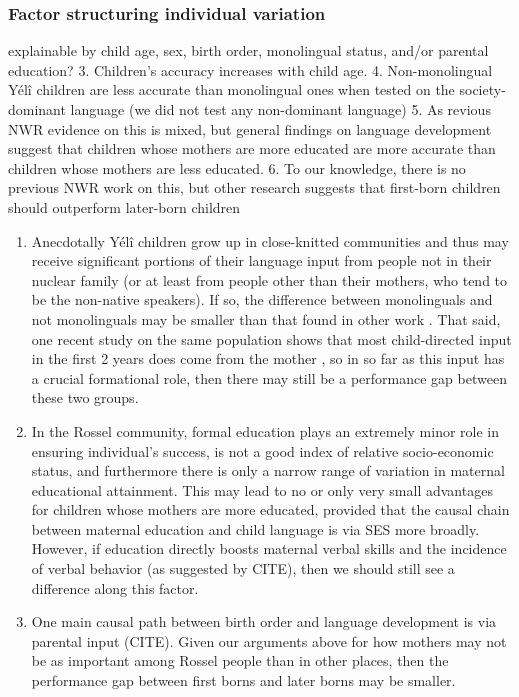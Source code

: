 \documentclass[english,,man,floatsintext]{apa6}
\providecommand{\tightlist}{%
  \setlength{\itemsep}{0pt}\setlength{\parskip}{0pt}}
\begin{document}
\hypertarget{factor-structuring-individual-variation}{%
\subsubsection{Factor structuring individual variation}\label{factor-structuring-individual-variation}}

explainable by child age, sex, birth order, monolingual status, and/or parental education?
3. Children's accuracy increases with child age.
4. Non-monolingual Yélî children are less accurate than monolingual ones when tested on the society-dominant language (we did not test any non-dominant language)
5. As revious NWR evidence on this is mixed, but general findings on language development suggest that children whose mothers are more educated are more accurate than children whose mothers are less educated.
6. To our knowledge, there is no previous NWR work on this, but other research suggests that first-born children should outperform later-born children

\begin{enumerate}
\def\labelenumi{\arabic{enumi}.}
\setcounter{enumi}{3}
\tightlist
\item
  Anecdotally Yélî children grow up in close-knitted communities and thus may receive significant portions of their language input from people not in their nuclear family
  (or at least from people other than their mothers, who tend to be the non-native speakers). If so, the difference between monolinguals and not monolinguals may be smaller than that found in other work
  . That said, one recent study on the same population shows that most child-directed input in the first 2 years does come from the mother
  , so in so far as this input has a crucial formational role, then there may still be a performance gap between these two groups.
\item
  In the Rossel community, formal education plays an extremely minor role in ensuring individual's success, is not a good index of relative socio-economic status, and furthermore there is only a narrow range of variation in maternal educational attainment. This may lead to no or only very small advantages for children whose mothers are more educated, provided that the causal chain between maternal education and child language is via SES more broadly. However, if education directly boosts maternal verbal skills and the incidence of verbal behavior (as suggested by CITE), then we should still see a difference along this factor.
\item
  One main causal path between birth order and language development is via parental input (CITE). Given our arguments above for how mothers may not be as important among Rossel people than in other places, then the performance gap between first borns and later borns may be smaller.
\end{enumerate}
\end{document}
